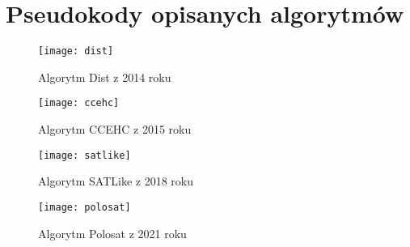 \documentclass[shortabstract]{iithesis}
\begin{document}
\chapter{Pseudokody opisanych algorytmów}

\begin{figure}[h]
	\caption{Algorytm Dist z 2014 roku \cite{dist}}
	\label{dist-code}	\texttt{[image: dist]}
\end{figure}

\begin{figure}[h]
	\caption{Algorytm CCEHC z 2015 roku \cite{ccehc}}
	\label{ccehc-code}
	\texttt{[image: ccehc]}	
\end{figure}

\begin{figure}[h]
	\caption{Algorytm SATLike z 2018 roku \cite{satlike}}
	\label{satlike-code}
	\texttt{[image: satlike]}	
\end{figure}

\begin{figure}[h]
	\caption{Algorytm Polosat z 2021 roku \cite{ttopenwbo}}
	\label{polosat-code}
	\texttt{[image: polosat]}	
\end{figure}



\end{document}
